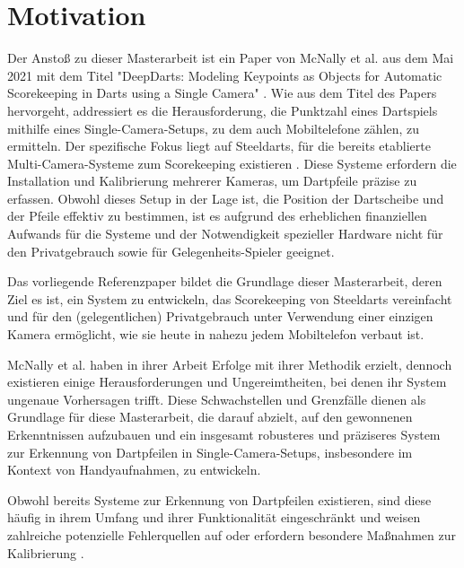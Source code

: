 \section{Motivation}
\label{sec:motivation}

Der Anstoß zu dieser Masterarbeit ist ein Paper von McNally et al. aus dem Mai 2021 mit dem Titel "DeepDarts: Modeling Keypoints as Objects for Automatic Scorekeeping in Darts using a Single Camera" \cite{deepdarts}. Wie aus dem Titel des Papers hervorgeht, addressiert es die Herausforderung, die Punktzahl eines Dartspiels mithilfe eines Single-Camera-Setups, zu dem auch Mobiltelefone zählen, zu ermitteln. Der spezifische Fokus liegt auf Steeldarts, für die bereits etablierte Multi-Camera-Systeme zum Scorekeeping existieren \cite{autodarts, scoliadarts}.
Diese Systeme erfordern die Installation und Kalibrierung mehrerer Kameras, um Dartpfeile präzise zu erfassen. Obwohl dieses Setup in der Lage ist, die Position der Dartscheibe und der Pfeile effektiv zu bestimmen, ist es aufgrund des erheblichen finanziellen Aufwands für die Systeme und der Notwendigkeit spezieller Hardware nicht für den Privatgebrauch sowie für Gelegenheits-Spieler geeignet.

Das vorliegende Referenzpaper bildet die Grundlage dieser Masterarbeit, deren Ziel es ist, ein System zu entwickeln, das Scorekeeping von Steeldarts vereinfacht und für den (gelegentlichen) Privatgebrauch unter Verwendung einer einzigen Kamera ermöglicht, wie sie heute in nahezu jedem Mobiltelefon verbaut ist.

McNally et al. haben in ihrer Arbeit Erfolge mit ihrer Methodik erzielt, dennoch existieren einige Herausforderungen und Ungereimtheiten, bei denen ihr System ungenaue Vorhersagen trifft. Diese Schwachstellen und Grenzfälle dienen als Grundlage für diese Masterarbeit, die darauf abzielt, auf den gewonnenen Erkenntnissen aufzubauen und ein insgesamt robusteres und präziseres System zur Erkennung von Dartpfeilen in Single-Camera-Setups, insbesondere im Kontext von Handyaufnahmen, zu entwickeln.

Obwohl bereits Systeme zur Erkennung von Dartpfeilen existieren, sind diese häufig in ihrem Umfang und ihrer Funktionalität eingeschränkt und weisen zahlreiche potenzielle Fehlerquellen auf oder erfordern besondere Maßnahmen zur Kalibrierung \cite{darts_project, opencv_steel_darts, dartscore_repo}.

\iffalse

